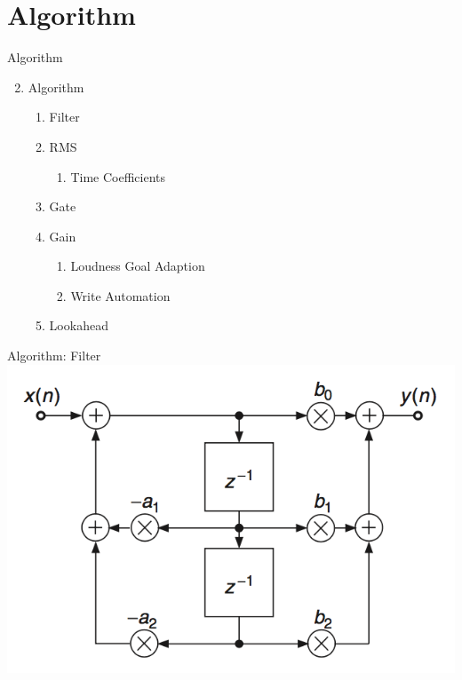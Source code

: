 \section{Algorithm}


\begin{frame}[c]{Algorithm}{}
    \begin{enumerate}
        \setcounter{enumi}{1}
        \item Algorithm
            \begin{enumerate}
                \item Filter
                \item RMS
            		\begin{enumerate}
                		\item Time Coefficients     
            		\end{enumerate}
                \item Gate
                \item Gain
            		\begin{enumerate}
					\item Loudness Goal Adaption  
					\item Write Automation  
            		\end{enumerate}
                \item Lookahead
            \end{enumerate}
    \end{enumerate}
\end{frame}

\begin{frame}[c]{Algorithm: Filter}{}
	\includegraphics[scale=0.3]{images/biquat}
	\centering

    \printbibliography%
\end{frame}

